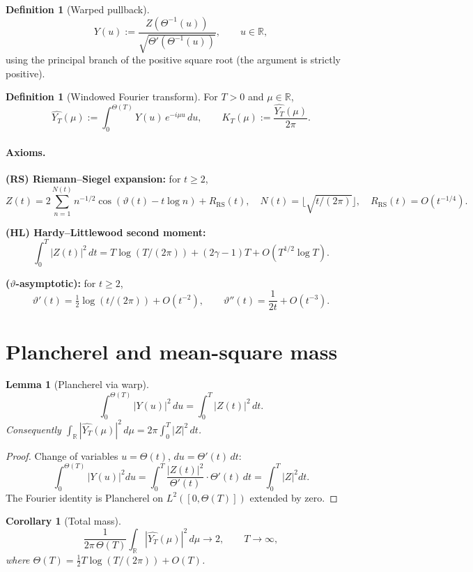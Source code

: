 \documentclass[11pt]{article}
\newtheorem{lemma}[theorem]{Lemma}
\newtheorem{corollary}[theorem]{Corollary}
\theoremstyle{definition}
\newtheorem{definition}[theorem]{Definition}
\theoremstyle{remark}
\newcommand{\R}{\mathbb{R}}
\begin{document}
\begin{definition}[Warped pullback]
\[
Y(u) := \frac{Z(\Theta^{-1}(u))}{\sqrt{\Theta'(\Theta^{-1}(u))}}, \qquad u \in \R,
\]
using the principal branch of the positive square root (the argument is strictly positive).
\end{definition}

\begin{definition}[Windowed Fourier transform]
For $T > 0$ and $\mu \in \R$,
\[
\widehat{Y_T}(\mu) := \int_0^{\Theta(T)} Y(u)\, e^{-i\mu u}\, du, \qquad K_T(\mu) := \frac{\widehat{Y_T}(\mu)}{2\pi}.
\]
\end{definition}

\paragraph{Axioms.}

\textbf{(RS) Riemann--Siegel expansion:} for $t \geq 2$,
\[
Z(t) = 2\sum_{n=1}^{N(t)} n^{-1/2}\cos(\vartheta(t) - t\log n) + R_{\mathrm{RS}}(t), \quad N(t) = \lfloor\sqrt{t/(2\pi)}\rfloor, \quad R_{\mathrm{RS}}(t) = O(t^{-1/4}).
\]

\textbf{(HL) Hardy--Littlewood second moment:}
\[
\int_0^T |Z(t)|^2\, dt = T\log(T/(2\pi)) + (2\gamma - 1)T + O(T^{1/2}\log T).
\]

\textbf{($\vartheta$-asymptotic):} for $t \geq 2$,
\[
\vartheta'(t) = \tfrac12\log(t/(2\pi)) + O(t^{-2}), \qquad \vartheta''(t) = \frac{1}{2t} + O(t^{-3}).
\]

\section{Plancherel and mean-square mass}

\begin{lemma}[Plancherel via warp]\label{lem:plancherel}
\[
\int_0^{\Theta(T)} |Y(u)|^2\, du = \int_0^T |Z(t)|^2\, dt.
\]
Consequently $\int_\R |\widehat{Y_T}(\mu)|^2\, d\mu = 2\pi \int_0^T |Z|^2\, dt$.
\end{lemma}

\begin{proof}
Change of variables $u = \Theta(t)$, $du = \Theta'(t)\, dt$:
\[
\int_0^{\Theta(T)} |Y(u)|^2 du = \int_0^T \frac{|Z(t)|^2}{\Theta'(t)}\cdot \Theta'(t)\, dt = \int_0^T |Z|^2 dt.
\]
The Fourier identity is Plancherel on $L^2([0,\Theta(T)])$ extended by zero.
\end{proof}

\begin{corollary}[Total mass]\label{cor:mass}
\[
\frac{1}{2\pi\,\Theta(T)}\int_\R |\widehat{Y_T}(\mu)|^2\, d\mu \longrightarrow 2, \qquad T \to \infty,
\]
where $\Theta(T) = \tfrac12 T \log(T/(2\pi)) + O(T)$.
\end{corollary}
\end{document}
